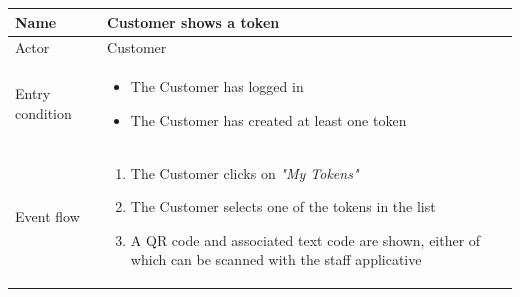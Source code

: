 \begin{table}[H]
    \begin{tabu} to \textwidth {|X|X[4]|}
        \hline
        Name            & Customer shows a token     \\ \hline
        Actor           & Customer                   \\ \hline
        Entry condition & \begin{itemize}
            \item The Customer has logged in
            \item The Customer has created at least one token
        \end{itemize} \\ \hline
        Event flow      & \begin{enumerate}
            \item The Customer clicks on \emph{"My Tokens"}
            \item The Customer selects one of the tokens in the list
            \item A QR code and associated text code are shown, either of which can be scanned with the staff applicative
        \end{enumerate} \\ \hline
    \end{tabu}
\end{table}

